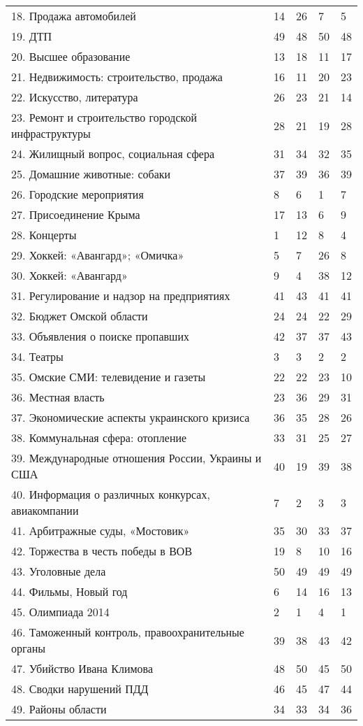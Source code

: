 \begin{longtable}[c]{| C{7cm} | R{2cm} | R{2cm} | R{2cm} | R{2cm} | }
18. Продажа автомобилей & 14 & 26 & 7 & 5 \\
19. ДТП & 49 & 48 & 50 & 48 \\
20. Высшее образование & 13 & 18 & 11 & 17 \\
21. Недвижимость: строительство, продажа & 16 & 11 & 20 & 23 \\
22. Искусство, литература & 26 & 23 & 21 & 14 \\
23. Ремонт и строительство городской инфраструктуры & 28 & 21 & 19 & 28 \\
24. Жилищный вопрос, социальная сфера & 31 & 34 & 32 & 35 \\
25. Домашние животные: собаки & 37 & 39 & 36 & 39 \\
26. Городские мероприятия & 8 & 6 & 1 & 7 \\
27. Присоединение Крыма & 17 & 13 & 6 & 9 \\
28. Концерты & 1 & 12 & 8 & 4 \\
29. Хоккей: «Авангард»; «Омичка» & 5 & 7 & 26 & 8 \\
30. Хоккей: «Авангард» & 9 & 4 & 38 & 12 \\
31. Регулирование и надзор на предприятиях & 41 & 43 & 41 & 41 \\
32. Бюджет Омской области & 24 & 24 & 22 & 29 \\
33. Объявления о поиске пропавших & 42 & 37 & 37 & 43 \\
34. Театры & 3 & 3 & 2 & 2 \\
35. Омские СМИ: телевидение и газеты & 22 & 22 & 23 & 10 \\
36. Местная власть & 23 & 36 & 29 & 31 \\
37. Экономические аспекты украинского кризиса & 36 & 35 & 28 & 26 \\
38. Коммунальная сфера: отопление & 33 & 31 & 25 & 27 \\
39. Международные отношения России, Украины и США & 40 & 19 & 39 & 38 \\
40. Информация о различных конкурсах, авиакомпании & 7 & 2 & 3 & 3 \\
41. Арбитражные суды, «Мостовик» & 35 & 30 & 33 & 37 \\
42. Торжества в честь победы в ВОВ & 19 & 8 & 10 & 16 \\
43. Уголовные дела & 50 & 49 & 49 & 49 \\
44. Фильмы, Новый год & 6 & 14 & 16 & 13 \\
45. Олимпиада 2014 & 2 & 1 & 4 & 1 \\
46. Таможенный контроль, правоохранительные органы & 39 & 38 & 43 & 42 \\
47. Убийство Ивана Климова & 48 & 50 & 45 & 50 \\
48. Сводки нарушений ПДД & 46 & 45 & 47 & 44 \\
49. Районы области & 34 & 33 & 34 & 36 \\
	\hline
\end{longtable}
